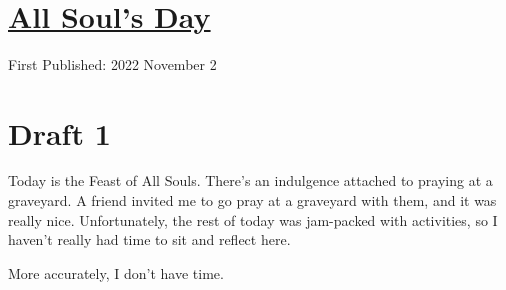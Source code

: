 \documentclass[12pt]{article}[titlepage]
\newcommand{\1}{\={a}}
\newcommand{\2}{\={e}}
\newcommand{\3}{\={\i}}
\newcommand{\4}{\=o}
\newcommand{\5}{\=u}
\newcommand{\6}{\={A}}
\renewcommand{\,}{\textsuperscript{,}}
\begin{document}

\doublespacing
\section{\href{all-souls.html}{All Soul's Day}}
First Published: 2022 November 2
\section{Draft 1}
Today is the Feast of All Souls.
There's an indulgence attached to praying at a graveyard.
A friend invited me to go pray at a graveyard with them, and it was really nice.
Unfortunately, the rest of today was jam-packed with activities, so I haven't really had time to sit and reflect here.

More accurately, I don't have time.
\end{document}
